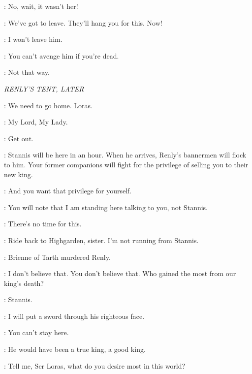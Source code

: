 \CATELYN: No, wait, it wasn't her! 


\CATELYN: We've got to leave. They'll hang you for this. Now! 

\BRIENNE: I won't leave him. 

\CATELYN: You can't avenge him if you're dead. 


\BRIENNE: Not that way. 



\scene

\textit{RENLY'S TENT, LATER}


\MARGAERY: We need to go home. Loras. 


\LITTLEFINGER: My Lord, My Lady. 

\LORAS: Get out. 

\LITTLEFINGER: Stannis will be here in an hour. When he arrives, Renly's bannermen will flock to him. Your former companions will fight for the privilege of selling you to their new king. 


\LORAS: And you want that privilege for yourself. 

\LITTLEFINGER: You will note that I am standing here talking to you, not Stannis. 

\MARGAERY: There's no time for this. 

\LORAS: Ride back to Highgarden, sister. I'm not running from Stannis. 

\MARGAERY: Brienne of Tarth murdered Renly. 

\LORAS: I don't believe that. You don't believe that. Who gained the most from our king's death? 

\LITTLEFINGER: Stannis. 

\LORAS: I will put a sword through his righteous face. 

\MARGAERY: You can't stay here. 

\LORAS: He would have been a true king, a good king. 

\LITTLEFINGER: Tell me, Ser Loras, what do you desire most in this world? 

